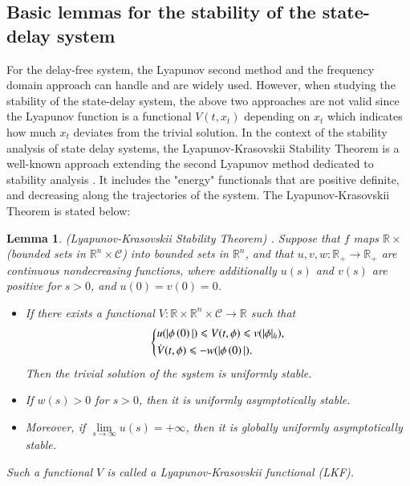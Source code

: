 \documentclass[journal]{IEEEtran}
\newtheorem{lemma}[theorem]{Lemma}
\begin{document}
\subsection{Basic lemmas for the stability of the state-delay system}
\label{Section 2.2}

For the delay-free system, the Lyapunov second method and the frequency domain approach can handle and are widely used. However, when studying the stability of the state-delay system, the above two approaches are not valid since the Lyapunov function is a functional $V(t,x_t)$ depending on $x_t$ which indicates how much $x_t$ deviates from the trivial solution. In the context of the stability analysis of state delay systems, the Lyapunov-Krasovskii Stability Theorem is a well-known approach extending the second Lyapunov method dedicated to stability analysis \citep{gu2001further}. It includes the "energy" functionals that are positive definite, and decreasing along the trajectories of the system. The Lyapunov-Krasovskii Theorem is stated below:
\begin{lemma}
  \label{lemma1}
  (Lyapunov-Krasovskii Stability Theorem) \citep{gu2003stability}. Suppose that $f$ maps $\mathbb{R} \times  $(bounded sets in ${\mathbb{R}^n} \times \mathcal{C} $) into bounded sets in ${\mathbb{R}^n} $, and that $u,v,w:{\mathbb{R}_ + } \to {\mathbb{R}_ + } $ are continuous nondecreasing functions, where additionally $u(s) $ and $v(s) $ are positive for $s > 0 $, and $u(0) = v(0) = 0 $.
  \begin{itemize}
    \item If there exists a functional $V:\mathbb{R} \times {\mathbb{R}^n} \times \mathcal{C} \to \mathbb{R} $ such that
          \begin{equation}
            \left\{ \begin{gathered}
              u(|\phi \left( 0 \right)|) \leqslant V(t,\phi ) \leqslant v(|\phi {|_h}) \hfill, \\
              \dot V(t,\phi ) \leqslant  - w(|\phi \left( 0 \right)|). \hfill \\
            \end{gathered}  \right.
            \label{eq15}
          \end{equation}
          Then the trivial solution of the system is uniformly stable.

    \item If $w(s) > 0 $ for $s > 0 $, then it is uniformly asymptotically stable.
    \item Moreover, if $\mathop {\lim }\limits_{s \to \infty } u(s) =  + \infty  $, then it is globally uniformly asymptotically stable.
  \end{itemize}

  Such a functional $V $ is called a Lyapunov-Krasovskii functional (LKF).
\end{lemma}
\end{document}

